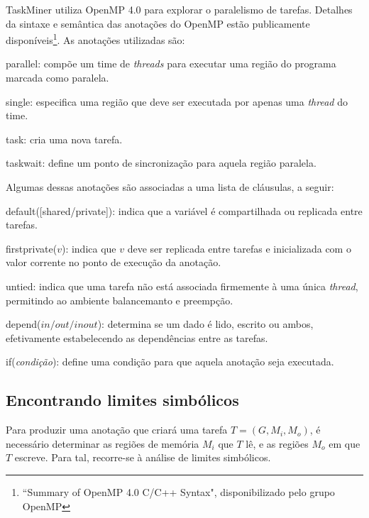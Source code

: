 \documentclass[sigplan,10pt,review]{acmart}
\newcommand\Taskminer{\mbox{\textsf{TaskMiner}}}
\begin{document}
{\Taskminer} utiliza OpenMP 4.0 para explorar o paralelismo de tarefas. Detalhes da sintaxe e semântica
das anotações do OpenMP estão publicamente disponíveis\footnote{``Summary of OpenMP 4.0 C/C++ Syntax", disponibilizado
pelo grupo OpenMP}. As anotações utilizadas são:
%
\begin{compactitem}
\item \textsf{parallel}: compõe um time de \textit{threads}
para executar uma região do programa marcada como paralela.
\item \textsf{single}: especifica uma região que deve ser executada
por apenas uma \textit{thread} do time.
\item \textsf{task}: cria uma nova tarefa.
\item \textsf{taskwait}: define um ponto de sincronização para aquela
região paralela.
\end{compactitem}
%
Algumas dessas anotações são associadas a uma lista de cláusulas, a seguir:
\begin{compactitem}
\item \textsf{default([shared/private])}: indica que a variável é compartilhada ou replicada
entre tarefas.
\item \textsf{firstprivate($v$)}: indica que $v$ deve ser replicada entre tarefas e inicializada
com o valor corrente no ponto de execução da anotação.
\item \textsf{untied}: indica que uma tarefa não está associada firmemente à uma única \textit{thread},
permitindo ao ambiente balancemanto e preempção.
\item \textsf{depend}($\mathit{in}/\mathit{out}/\mathit{inout}$): determina se um dado é lido, escrito
ou ambos, efetivamente estabelecendo as dependências entre as tarefas.
\item \textsf{if}({\em condição}): define uma condição para que aquela anotação seja executada.
\end{compactitem}

\subsection{Encontrando limites simbólicos}
\label{sec:sra}

Para produzir uma anotação que criará uma tarefa $T = (G, M_i, M_o)$,
é necessário determinar as regiões de memória $M_i$ que $T$ lê, e as regiões
$M_o$ em que $T$ escreve. Para tal, recorre-se à análise de limites simbólicos.
 
\end{document}
